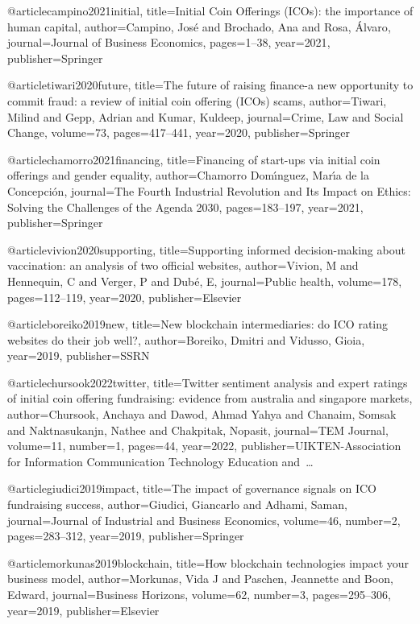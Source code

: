 @article{campino2021initial,
  title={Initial Coin Offerings (ICOs): the importance of human capital},
  author={Campino, Jos{\'e} and Brochado, Ana and Rosa, {\'A}lvaro},
  journal={Journal of Business Economics},
  pages={1--38},
  year={2021},
  publisher={Springer}
}

@article{tiwari2020future,
  title={The future of raising finance-a new opportunity to commit fraud: a review of initial coin offering (ICOs) scams},
  author={Tiwari, Milind and Gepp, Adrian and Kumar, Kuldeep},
  journal={Crime, Law and Social Change},
  volume={73},
  pages={417--441},
  year={2020},
  publisher={Springer}
}

@article{chamorro2021financing,
  title={Financing of start-ups via initial coin offerings and gender equality},
  author={Chamorro Dom{\'\i}nguez, Mar{\'\i}a de la Concepci{\'o}n},
  journal={The Fourth Industrial Revolution and Its Impact on Ethics: Solving the Challenges of the Agenda 2030},
  pages={183--197},
  year={2021},
  publisher={Springer}
}

@article{vivion2020supporting,
  title={Supporting informed decision-making about vaccination: an analysis of two official websites},
  author={Vivion, M and Hennequin, C and Verger, P and Dub{\'e}, E},
  journal={Public health},
  volume={178},
  pages={112--119},
  year={2020},
  publisher={Elsevier}
}

@article{boreiko2019new,
  title={New blockchain intermediaries: do ICO rating websites do their job well?},
  author={Boreiko, Dmitri and Vidusso, Gioia},
  year={2019},
  publisher={SSRN}
}

@article{chursook2022twitter,
  title={Twitter sentiment analysis and expert ratings of initial coin offering fundraising: evidence from australia and singapore markets},
  author={Chursook, Anchaya and Dawod, Ahmad Yahya and Chanaim, Somsak and Naktnasukanjn, Nathee and Chakpitak, Nopasit},
  journal={TEM Journal},
  volume={11},
  number={1},
  pages={44},
  year={2022},
  publisher={UIKTEN-Association for Information Communication Technology Education and~…}
}

@article{giudici2019impact,
  title={The impact of governance signals on ICO fundraising success},
  author={Giudici, Giancarlo and Adhami, Saman},
  journal={Journal of Industrial and Business Economics},
  volume={46},
  number={2},
  pages={283--312},
  year={2019},
  publisher={Springer}
}

@article{morkunas2019blockchain,
  title={How blockchain technologies impact your business model},
  author={Morkunas, Vida J and Paschen, Jeannette and Boon, Edward},
  journal={Business Horizons},
  volume={62},
  number={3},
  pages={295--306},
  year={2019},
  publisher={Elsevier}
}

